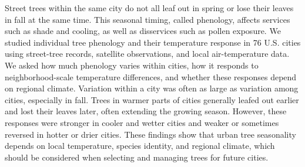 Street trees within the same city do not all leaf out in spring or lose their leaves in fall at the same time. This seasonal timing, called phenology, affects services such as shade and cooling, as well as disservices such as pollen exposure. We studied individual tree phenology and their temperature response in 76 U.S. cities using street-tree records, satellite observations, and local air-temperature data. We asked how much phenology varies within cities, how it responds to neighborhood-scale temperature differences, and whether these responses depend on regional climate. Variation within a city was often as large as variation among cities, especially in fall. Trees in warmer parts of cities generally leafed out earlier and lost their leaves later, often extending the growing season. However, these responses were stronger in cooler and wetter cities and weaker or sometimes reversed in hotter or drier cities. These findings show that urban tree seasonality depends on local temperature, species identity, and regional climate, which should be considered when selecting and managing trees for future cities.

\clearpage
